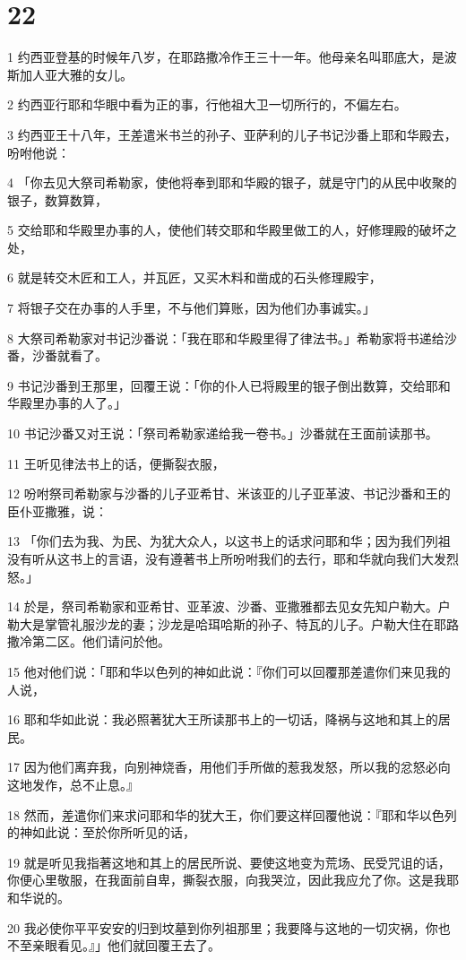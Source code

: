 \chapter{22}

\par 1 约西亚登基的时候年八岁，在耶路撒冷作王三十一年。他母亲名叫耶底大，是波斯加人亚大雅的女儿。
\par 2 约西亚行耶和华眼中看为正的事，行他祖大卫一切所行的，不偏左右。
\par 3 约西亚王十八年，王差遣米书兰的孙子、亚萨利的儿子书记沙番上耶和华殿去，吩咐他说：
\par 4 「你去见大祭司希勒家，使他将奉到耶和华殿的银子，就是守门的从民中收聚的银子，数算数算，
\par 5 交给耶和华殿里办事的人，使他们转交耶和华殿里做工的人，好修理殿的破坏之处，
\par 6 就是转交木匠和工人，并瓦匠，又买木料和凿成的石头修理殿宇，
\par 7 将银子交在办事的人手里，不与他们算账，因为他们办事诚实。」
\par 8 大祭司希勒家对书记沙番说：「我在耶和华殿里得了律法书。」希勒家将书递给沙番，沙番就看了。
\par 9 书记沙番到王那里，回覆王说：「你的仆人已将殿里的银子倒出数算，交给耶和华殿里办事的人了。」
\par 10 书记沙番又对王说：「祭司希勒家递给我一卷书。」沙番就在王面前读那书。
\par 11 王听见律法书上的话，便撕裂衣服，
\par 12 吩咐祭司希勒家与沙番的儿子亚希甘、米该亚的儿子亚革波、书记沙番和王的臣仆亚撒雅，说：
\par 13 「你们去为我、为民、为犹大众人，以这书上的话求问耶和华；因为我们列祖没有听从这书上的言语，没有遵著书上所吩咐我们的去行，耶和华就向我们大发烈怒。」
\par 14 於是，祭司希勒家和亚希甘、亚革波、沙番、亚撒雅都去见女先知户勒大。户勒大是掌管礼服沙龙的妻；沙龙是哈珥哈斯的孙子、特瓦的儿子。户勒大住在耶路撒冷第二区。他们请问於他。
\par 15 他对他们说：「耶和华以色列的神如此说：『你们可以回覆那差遣你们来见我的人说，
\par 16 耶和华如此说：我必照著犹大王所读那书上的一切话，降祸与这地和其上的居民。
\par 17 因为他们离弃我，向别神烧香，用他们手所做的惹我发怒，所以我的忿怒必向这地发作，总不止息。』
\par 18 然而，差遣你们来求问耶和华的犹大王，你们要这样回覆他说：『耶和华以色列的神如此说：至於你所听见的话，
\par 19 就是听见我指著这地和其上的居民所说、要使这地变为荒场、民受咒诅的话，你便心里敬服，在我面前自卑，撕裂衣服，向我哭泣，因此我应允了你。这是我耶和华说的。
\par 20 我必使你平平安安的归到坟墓到你列祖那里；我要降与这地的一切灾祸，你也不至亲眼看见。』」他们就回覆王去了。

